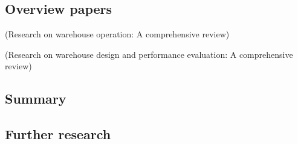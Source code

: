 \documentclass[a4paper,11pt]{article}
\begin{document}
\subsection{Overview papers}
\cite{gu2007research} (Research on warehouse operation: A comprehensive review)

\cite{gu2010research} (Research on warehouse design and performance evaluation: A comprehensive review)

\subsection{Summary}


\subsection{Further research}




\end{document}
